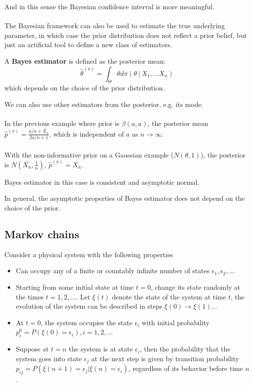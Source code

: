 \documentclass{article}
\begin{document}
And in this sense the Bayesian confidence interval is more meaningful.
\\
\\

The Bayesian framework can also be used to estimate the true underlying parameter,
in which case the prior distribution does not reflect a prior belief,
but just an artificial tool to define a new class of estimators.

A \textbf{Bayes estimator} is defined as the posterior mean:
$$
\hat{\theta}^{(\pi)} = \int_{\Theta} \theta d\pi(\theta ~ | ~ X_1, \dots X_n)
$$
which depends on the choice of the prior distribution.

We can also use other estimators from the posterior, e.g. its mode.
\\
\\
In the previous example where prior is $\beta(a, a)$,
the posterior mean $\hat{p}^{(\pi)} = \frac{a / n + \bar{X_n}}{2 a / n + 1}$,
which is independent of $a$ as $n \rightarrow \infty$.
\\
\\
With the non-informative prior on a Gaussian example ($\mathit{N}(\theta, 1)$),
the posterior is $\mathit{N}(\bar{X_n}, \frac{1}{n})$,
$\hat{p}^{(\pi)} = \bar{X_n}$.

Bayes estimator in this case is consistent and asymptotic normal.

In general,
the asymptotic properties of Bayes estimator does not depend on the choice of the prior.


\subsection{Markov chains}

Consider a physical system with the following properties

\begin{itemize}
  \item Can occupy any of a finite or countably infinite number of states $\epsilon_1, \epsilon_2, \dots$
  \item Starting from some initial state at time $t = 0$, change its state randomly at the times $t = 1, 2, \dots$. Let $\xi(t)$ denote the state of the system at time $t$, the evolution of the system can be described in steps $\xi(0) \to \xi(1) \dots$
  \item At $t = 0$, the system occupies the state $\epsilon_i$ with initial probability $p^0_i = P(\xi(0) = \epsilon_i), i = 1, 2, \dots$
  \item Suppose at $t = n$ the system is at state $\epsilon_i$, then the probability that the system goes into state $\epsilon_j$ at the next step is given by transition probability $p_{ij} = P(\xi(n + 1) = \epsilon_j | \xi(n) = \epsilon_i)$, regardless of its behavior before time $n$.
\end{itemize}
\end{document}
